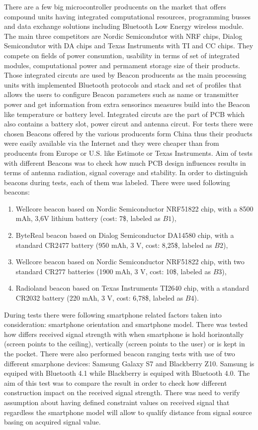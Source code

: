 \documentclass[../main.tex]{subfiles}
\begin{document}
There are a few big microcontroller producents on the market that offers compound units having integrated computational resources, programming busses and data exchange solutions including Bluetooth Low Energy wireless module. The main three competitors are Nordic Semicondutor with NRF chips, Dialog Semicondutor with DA chips and Texas Instruments with TI and CC chips. They compete on fields of power consumtion, usability in terms of set of integrated modules, computational power and permament storage size of their products. Those integrated circuts are used by Beacon producents as the main processing units with implemented Bluetooth protocols and stack and set of profiles that allows the users to configure Beacon parameters such as name or transmitter power and get information from extra sensorincs measures build into the Beacon like temperature or battery level. Integrated circuts are the part of PCB which also contains a battery slot, power circut and antenna circut. For tests there were chosen Beacons offered by the various producents form China thus their products were easily available via the Internet and they were cheaper than from producents from Europe or U.S. like Estimote or Texas Instruments\cite{beacons_ble_evaluation}. Aim of tests with different Beacons was to check how much PCB design influences results in terms of antenna radiation, signal coverage and stability. In order to distinguish beacons during tests, each of them was labeled. There were used following beacons:
\begin{enumerate}
	\item Wellcore beacon based on Nordic Semiconductor NRF51822 chip, with a 8500 mAh, 3,6V lithium battery (cost: 7\$, labeled as $B1$),
	\item ByteReal beacon based on Dialog Semiconductor DA14580 chip, with a standard CR2477 battery (950 mAh, 3 V, cost: 8,25\$, labeled as $B2$),
	\item Wellcore beacon based on Nordic Semiconductor NRF51822 chip, with two standard CR277 batteries (1900 mAh, 3 V, cost: 10\$, labeled as $B3$),
	\item Radioland beacon based on Texas Instruments TI2640 chip, with a standard CR2032 battery (220 mAh, 3 V, cost: 6,78\$, labeled as $B4$).
\end{enumerate}

During tests there were following smartphone related factors taken into consideration: smartphone orientation and smartphone model. There was tested how differs received signal strength with when smartphone is hold horizontally (screen points to the ceiling), vertically (screen points to the user) or is kept in the pocket. There were also performed beacon ranging tests with use of two different smarphone devices: Samsung Galaxy S7 and Blackberry Z10. Samsung is equiped with Bluetooth 4.1 while Blackberry is equiped with Bluetooth 4.0. The aim of this test was to compare the result in order to check how different construction impact on the received signal strength. There was need to verify assumption about having defined constraint values on received signal that regardless the smartphone model will allow to qualify distance from signal source basing on acquired signal value.
\end{document}
